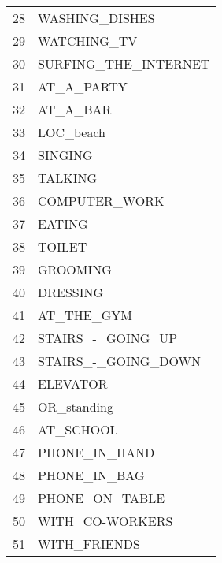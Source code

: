 \documentclass{UoNMCHA}
\numberwithin{equation}{section}
\begin{document}
\begin{table}[h]
\begin{center}
\begin{tabular}{ll}
28 & WASHING\_DISHES              \\
29 & WATCHING\_TV                 \\
30 & SURFING\_THE\_INTERNET       \\
31 & AT\_A\_PARTY                 \\
32 & AT\_A\_BAR                   \\
33 & LOC\_beach                   \\
34 & SINGING                      \\
35 & TALKING                      \\
36 & COMPUTER\_WORK               \\
37 & EATING                       \\
38 & TOILET                       \\
39 & GROOMING                     \\
40 & DRESSING                     \\
41 & AT\_THE\_GYM                 \\
42 & STAIRS\_-\_GOING\_UP         \\
43 & STAIRS\_-\_GOING\_DOWN       \\
44 & ELEVATOR                     \\
45 & OR\_standing                 \\
46 & AT\_SCHOOL                   \\
47 & PHONE\_IN\_HAND              \\
48 & PHONE\_IN\_BAG               \\
49 & PHONE\_ON\_TABLE             \\
50 & WITH\_CO-WORKERS             \\
51 & WITH\_FRIENDS                \\ \hline 
\end{tabular}    
\end{center}
\end{table}
\end{document}
